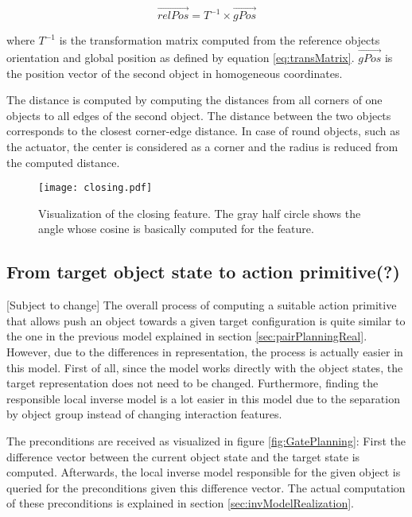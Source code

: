 \begin{equation}
	\vec{relPos} = T^{-1} \times \vec{gPos}
\label{eq:trans}
\end{equation}

where $T^{-1}$ is the transformation matrix computed from the reference objects orientation and global position as defined by equation \ref{eq:transMatrix}. $\vec{gPos}$ is the position vector of the second object in homogeneous coordinates. 

The distance is computed by computing the distances from all corners of one objects to all edges of the second object. %
The distance between the two objects corresponds to the closest corner-edge distance. In case of round objects, such as the actuator, the center is considered as a corner and the radius is reduced from the computed distance.

\begin{figure}
	\centering
	\texttt{[image: closing.pdf]}
	\caption{Visualization of the closing feature. The gray half circle shows the angle whose cosine is basically computed for the feature.} 
	\label{fig:closing}
\end{figure}

\subsection{From target object state to action primitive(?) \label{sec:gatePlanningReal}} %
[Subject to change]
The overall process of computing a suitable action primitive that allows push an object towards a given target configuration is quite similar to the one in the previous model explained in section \ref{sec:pairPlanningReal}. However, due to the differences in representation, the process is actually easier in this model. First of all, since the model works directly with the object states, the target representation does not need to be changed. Furthermore, finding the responsible local inverse model is a lot easier in this model due to the separation by object group instead of changing interaction features. 

The preconditions are received as visualized in figure \ref{fig:GatePlanning}: First the difference vector between the current object state and the target state is computed. Afterwards, the local inverse model responsible for the given object is queried for the preconditions given this difference vector. The actual computation of these preconditions is explained in section \ref{sec:invModelRealization}.

